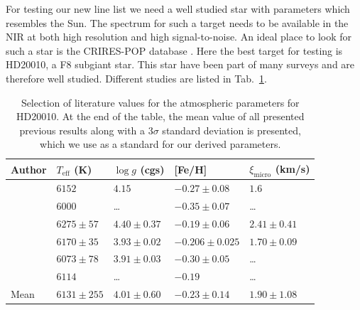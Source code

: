 \documentclass{aa}
\begin{document}
For testing our new line list we need a well studied star with
parameters which resembles the Sun. The spectrum for such a target
needs to be available in the NIR at both high resolution and high
signal-to-noise. An ideal place to look for such a star is the
CRIRES-POP database \citep{Lebzelter2012}. Here the best target for
testing is HD20010, a F8 subgiant star. This star have been part of
many surveys and are therefore well studied. Different studies are
listed in Tab.~\ref{tab:parameters}.

\begin{table}[htb!]
    \caption{Selection of literature values for the atmospheric parameters for HD20010.
    At the end of the table, the mean value of all presented previous results along with
    a $3 \sigma$ standard deviation is presented, which we use as a standard for our derived
    parameters.}
    \label{tab:parameters}
    \centering
    \begin{tabular}{l|llll}
      \hline\hline
     Author                 & $T_\mathrm{eff}$ (K) & $\log g$ (cgs)  &       [Fe/H]     & $\xi_\mathrm{micro}$ (km/s)  \\
      \hline
    \cite{Balachandran1990} & $6152$               & $4.15$          & $-0.27\pm0.08$   & $1.6$                        \\
    \cite{Favata1997}       & $6000$               & \ldots          & $-0.35\pm0.07$   & \ldots                       \\
    \cite{Santos2004}       & $6275\pm57$          & $4.40\pm0.37$   & $-0.19\pm0.06$   & $2.41\pm0.41$                \\
    \cite{Gonzalez2010}     & $6170\pm35$          & $3.93\pm0.02$   & $-0.206\pm0.025$ & $1.70\pm0.09$                \\
    \cite{Ramirez2012}      & $6073\pm78$          & $3.91\pm0.03$   & $-0.30\pm0.05$   & \ldots                       \\
    \cite{Mortier2013}      & $6114$               & \ldots          & $-0.19$          & \ldots                       \\
      \hline
      Mean                  & $6131\pm255$         & $4.01\pm0.60$   & $-0.23\pm0.14$   & $1.90\pm1.08$                \\
      \hline
    \end{tabular}
\end{table}
\end{document}
